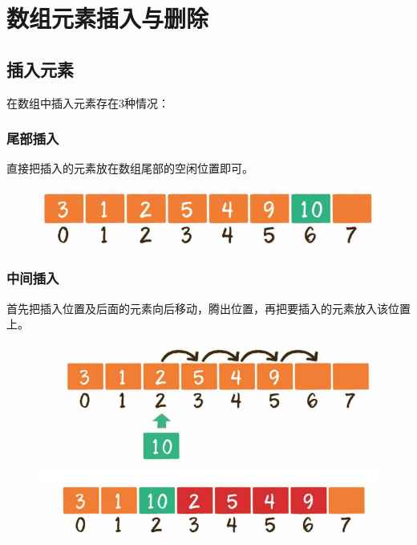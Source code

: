 \newpage

\section{数组元素插入与删除}

\subsection{插入元素}

在数组中插入元素存在3种情况：

\subsubsection{尾部插入}

直接把插入的元素放在数组尾部的空闲位置即可。

\begin{figure}[H]
	\centering
	\includegraphics[scale=0.9]{img/C2/2-3/1.png}
\end{figure}

\subsubsection{中间插入}

首先把插入位置及后面的元素向后移动，腾出位置，再把要插入的元素放入该位置上。

\begin{figure}[H]
	\centering
	\includegraphics[scale=0.9]{img/C2/2-3/2.png}
\end{figure}

